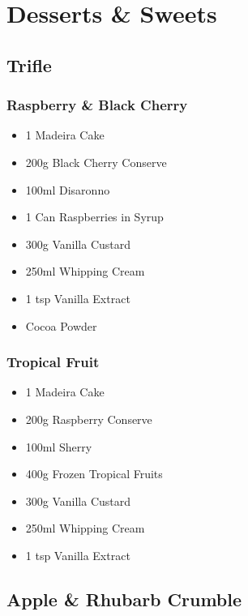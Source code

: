 \documentclass[11pt, english]{article}
\begin{document}
\section{Desserts \& Sweets}

	\subsection{Trifle}

		\subsubsection*{Raspberry \& Black Cherry}

	\begin{itemize}
        \setlength\itemsep{0cm}
                \item 1 Madeira Cake
		\item 200g Black Cherry Conserve
		\item 100ml Disaronno
		\item 1 Can Raspberries in Syrup
		\item 300g Vanilla Custard
		\item 250ml Whipping Cream
		\item 1 tsp Vanilla Extract
		\item Cocoa Powder
        \end{itemize}		

		\subsubsection*{Tropical Fruit}

	\begin{itemize}
        \setlength\itemsep{0cm}
                \item 1 Madeira Cake
		\item 200g Raspberry Conserve
		\item 100ml Sherry
		\item 400g Frozen Tropical Fruits
		\item 300g Vanilla Custard
		\item 250ml Whipping Cream
		\item 1 tsp Vanilla Extract
        \end{itemize}

\newpage

	\subsection{Apple \& Rhubarb Crumble}
\end{document}
